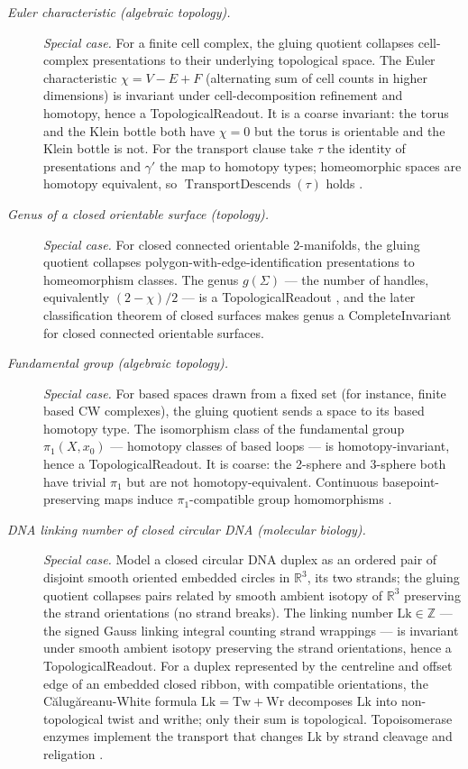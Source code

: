 \begingroup\small
\begin{description}
\item[\emph{Euler characteristic (algebraic
topology).}] \textit{Special case.}
For a finite cell complex, the gluing quotient
collapses cell-complex presentations to their
underlying topological space.  The Euler
characteristic
\(\chi=V-E+F\) (alternating sum of cell counts in
higher dimensions) is invariant under
cell-decomposition refinement and homotopy, hence a
TopologicalReadout.  It is a coarse invariant: the
torus and the Klein bottle both have \(\chi=0\) but
the torus is orientable and the Klein bottle is
not.  For the transport clause take \(\tau\) the identity of presentations
and \(\gamma'\) the map to homotopy types; homeomorphic spaces are homotopy
equivalent, so \(\operatorname{TransportDescends}(\tau)\) holds
\citep{Euler1750Polyhedron}.

\item[\emph{Genus of a closed orientable surface
(topology).}] \textit{Special case.}
For closed connected orientable 2-manifolds, the gluing
quotient collapses polygon-with-edge-identification
presentations to homeomorphism classes.  The genus
\(g(\Sigma)\) — the number of handles, equivalently
\((2-\chi)/2\) — is a TopologicalReadout \citep{Riemann1857Theorie}, and the later
classification theorem of closed surfaces makes
genus a CompleteInvariant for closed connected
orientable surfaces.

\item[\emph{Fundamental group (algebraic topology).}] \textit{Special case.}
For based spaces drawn from a fixed set (for instance, finite based CW
complexes), the gluing quotient sends a space to its based homotopy type.
The isomorphism class of the fundamental group \(\pi_1(X,x_0)\) — homotopy
classes of based loops — is homotopy-invariant,
hence a TopologicalReadout.  It is coarse: the
2-sphere and 3-sphere both have trivial \(\pi_1\)
but are not homotopy-equivalent.  Continuous
basepoint-preserving maps induce \(\pi_1\)-compatible
group homomorphisms \citep{Poincare1895Analysis}.

\item[\emph{{DNA} linking number of closed circular
{DNA} (molecular biology).}] \textit{Special case.}
Model a closed circular DNA duplex as an ordered pair of disjoint smooth oriented embedded circles in \(\mathbb R^3\), its two strands; the gluing quotient collapses pairs related by smooth ambient isotopy of \(\mathbb R^3\) preserving the strand orientations (no strand breaks).  The linking
number \(\mathrm{Lk}\in\mathbb Z\) — the signed
Gauss linking integral counting strand wrappings
— is invariant under smooth ambient isotopy preserving the strand orientations, hence a
TopologicalReadout.  For a duplex represented by the centreline and offset edge of an embedded closed ribbon, with compatible orientations, the Călugăreanu-White formula
\(\mathrm{Lk}=\mathrm{Tw}+\mathrm{Wr}\) decomposes
\(\mathrm{Lk}\) into non-topological twist and
writhe; only their sum is topological.
Topoisomerase enzymes implement the transport that
changes \(\mathrm{Lk}\) by strand cleavage and
religation \citep{BatesMaxwell2005DNATopology}.


\end{description}
